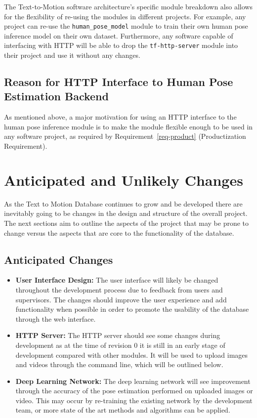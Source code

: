 \documentclass{scrreprt}
\begin{document}
The Text-to-Motion software architecture's specific module breakdown also
allows for the flexibility of re-using the modules in different projects. For
example, any project can re-use the \verb|human_pose_model| module to train
their own human pose inference model on their own dataset. Furthermore, any
software capable of interfacing with HTTP will be able to drop the
\verb|tf-http-server| module into their project and use it without any changes.

\section{Reason for HTTP Interface to Human Pose Estimation Backend}

As mentioned above, a major motivation for using an HTTP interface to the human
pose inference module is to make the module flexible enough to be used in any
software project, as required by Requirement~\ref{req-product} (Productization
Requirement).

\chapter{Anticipated and Unlikely Changes}

As the Text to Motion Database continues to grow and be developed there are
inevitably going to be changes in the design and structure of the overall
project. The next sections aim to outline the aspects of the project that may
be prone to change versus the aspects that are core to the functionality of the
database.

\section{Anticipated Changes}

\begin{itemize}
    \item \textbf {User Interface Design:} The user interface will likely be
            changed throughout the development process due to feedback from
                  users and supervisors. The changes should improve the user
                  experience and add functionality when possible in order to
                  promote the usability of the database through the web
                  interface.
    \item \textbf {HTTP Server:} The HTTP server should see some changes during
            development as at the time of revision 0 it is still in an early
                  stage of development compared with other modules. It will be
                  used to upload images and videos through the command line,
                  which will be outlined below.
    \item \textbf{Deep Learning Network:} The deep learning network will see
            improvement through the accuracy of the pose estimation performed
                  on uploaded images or video. This may occur by re-training
                  the existing network by the development team, or more state
                  of the art methods and algorithms can be applied.
\end{itemize}
\end{document}
